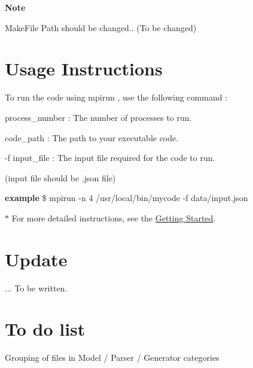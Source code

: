 {\bfseries Note} {\bfseries } 
\begin{DoxyItemize}
\item Make\-File Path should be changed.. (To be changed)
\end{DoxyItemize}\hypertarget{index_UsageInstructions}{}\section{Usage Instructions}\label{index_UsageInstructions}
To run the code using {\ttfamily  mpirun }, use the following command \-:





\begin{DoxyItemize}
\item process\-\_\-number \-: The number of processes to run.
\item code\-\_\-path \-: The path to your executable code.
\item -\/f input\-\_\-file \-: The input file required for the code to run.
\begin{DoxyItemize}
\item (input file should be {\ttfamily .json} file)
\end{DoxyItemize}
\end{DoxyItemize}

{\bfseries example} {\bfseries }  \$ mpirun -\/n 4 /usr/local/bin/mycode -\/f data/input.\-json 

{\bfseries $\ast$} For more detailed instructions, see the \hyperlink{GettingStarted}{Getting Started}.{\bfseries } \hypertarget{index_Update}{}\section{Update}\label{index_Update}
... To be written.\hypertarget{index_ToDoList}{}\section{To do list}\label{index_ToDoList}

\begin{DoxyItemize}
\item Grouping of files in Model / Parser / Generator categories 
\end{DoxyItemize}